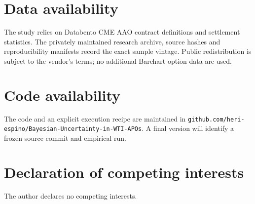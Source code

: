 \documentclass[a4paper,fleqn]{cas-dc}
\begin{document}
\section*{Data availability}
The study relies on Databento CME AAO contract definitions and
settlement statistics. The privately maintained research archive,
source hashes and reproducibility manifests record the exact
sample vintage. Public redistribution is subject to the vendor's
terms; no additional Barchart option data are used.

\section*{Code availability}
The code and an explicit execution recipe are maintained in
\texttt{github.com/heri-espino/Bayesian-Uncertainty-in-WTI-APOs}.
A final version will identify a frozen source commit and empirical run.

\section*{Declaration of competing interests}
The author declares no competing interests.



\end{document}
